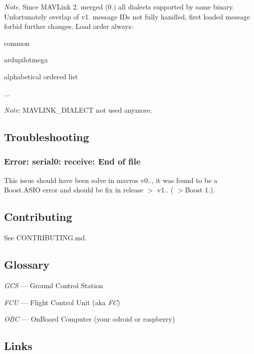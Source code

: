 {\itshape Note}. Since M\+A\+V\+Link 2. merged (0.) all dialects supported by same binary. Unfortunately overlap of v1. message ID\textquotesingle{}s not fully handled, first loaded message forbid further changes. Load order always\+:


\begin{DoxyEnumerate}
\item common
\item ardupilotmega
\item alphabetical ordered list
\item ...
\end{DoxyEnumerate}

{\itshape Note}\+: {\ttfamily M\+A\+V\+L\+I\+N\+K\+\_\+\+D\+I\+A\+L\+E\+CT} not used anymore.

\subsection*{Troubleshooting }

\subsubsection*{Error\+: serial0\+: receive\+: End of file}

This issue should have been solve in mavros v0.., it was found to be a Boost.\+A\+S\+IO error and should be fix in release $>$ v1.. ( $>$Boost 1.).

\subsection*{Contributing }

See C\+O\+N\+T\+R\+I\+B\+U\+T\+I\+NG.md.

\subsection*{Glossary }


\begin{DoxyItemize}
\item {\itshape G\+CS} — Ground Control Station
\item {\itshape F\+CU} — Flight Control Unit (aka {\itshape FC})
\item {\itshape O\+BC} — On\+Board Computer (your odroid or raspberry)
\end{DoxyItemize}

\subsection*{Links }


